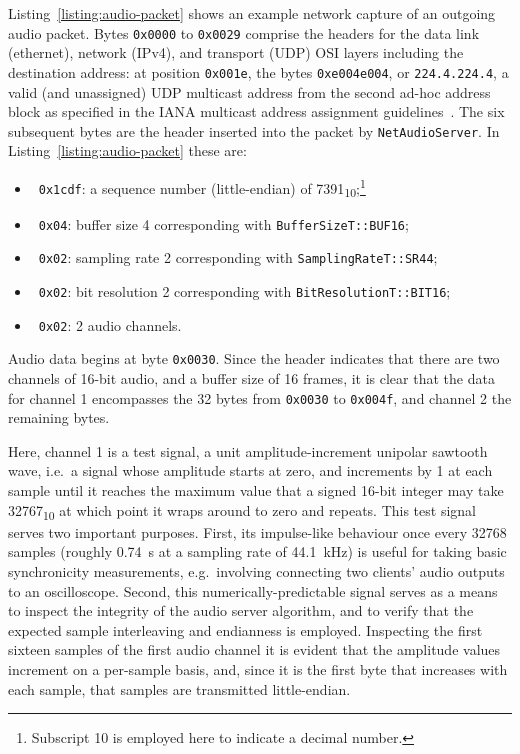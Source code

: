 \documentclass[utf8]{FrontiersinHarvard}
\newcommand{\lstref}[1]{Listing~\ref{#1}}
\newcommand{\numDec}[1]{\num{#1}\textsubscript{10}}
\begin{document}
    \lstref{listing:audio-packet} shows an example network capture of an outgoing
    audio packet.
    Bytes \texttt{0x0000} to \texttt{0x0029} comprise the headers for the data link
    (ethernet), network (IPv4), and transport (UDP) OSI layers including the
    destination address: at position \texttt{0x001e}, the bytes \texttt{0xe004e004},
    or \texttt{224.4.224.4}, a valid (and unassigned) UDP multicast address from the
    second ad-hoc address block as specified in the IANA multicast address
    assignment guidelines~\citep{meyer_iana_2010}.
    The six subsequent bytes are the header inserted into the packet by
    \texttt{NetAudioServer}.
    In \lstref{listing:audio-packet} these are:
    \begin{itemize}
        \item~\texttt{0x1cdf}: a sequence number (little-endian) of
        \numDec{7391};\footnote{Subscript 10 is employed here to indicate a decimal
        number.}
        \item~\texttt{0x04}: buffer size \num{4} corresponding with
        \texttt{BufferSizeT::BUF16};
        \item~\texttt{0x02}: sampling rate \num{2} corresponding with
        \texttt{SamplingRateT::SR44};
        \item~\texttt{0x02}: bit resolution \num{2} corresponding with
        \texttt{BitResolutionT::BIT16};
        \item~\texttt{0x02}: \num{2} audio channels.
    \end{itemize}

    Audio data begins at byte \texttt{0x0030}.
    Since the header indicates that there are two channels of 16-bit audio, and a
    buffer size of 16 frames, it is clear that the data for channel 1 encompasses
    the 32 bytes from \texttt{0x0030} to \texttt{0x004f}, and channel 2 the
    remaining bytes.

    Here, channel 1 is a test signal, a unit amplitude-increment unipolar sawtooth
    wave, i.e.\ a signal whose amplitude starts at zero, and increments by 1 at each
    sample until it reaches the maximum value that a signed 16-bit integer may take
    \textemdash{} \numDec{32767} \textemdash{} at which point it wraps around to
    zero and repeats.
    This test signal serves two important purposes.
    First, its impulse-like behaviour once every \num{32768} samples (roughly
    \qty{.74}{\s} at a sampling rate of \qty{44.1}{\kHz}) is useful for taking basic
    synchronicity measurements, e.g.\ involving connecting two clients' audio
    outputs to an oscilloscope.
    Second, this numerically-predictable signal serves as a means to inspect the
    integrity of the audio server algorithm, and to verify that the expected
    sample interleaving and endianness is employed.
    Inspecting the first sixteen samples of the first audio channel
    it is evident that the amplitude values increment on a per-sample basis, and,
    since it is the first byte that increases with each sample, that samples are
    transmitted little-endian.
\end{document}
